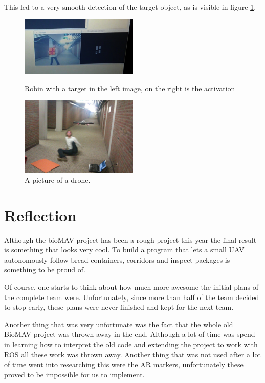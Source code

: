 \documentclass[a4paper,10pt]{article}
\begin{document}
This led to a very smooth detection of the target object, as is visible in figure \ref{fig:robinPresentActivation}. 

\begin{figure}[h!]
	\caption{Robin with a target in the left image, on the right is the activation}
	\centering
	\includegraphics[width=0.5\textwidth]{images/robinPresentActivation}
	\label{fig:robinPresentActivation}
\end{figure}

\begin{figure}[h!]
	\caption{A picture of a drone.}
	\centering
	\includegraphics[width=0.5\textwidth]{images/droneAttack}
\end{figure}

\section{Reflection}

Although the bioMAV project has been a rough project this year the final result is something that looks very cool. 
To build a program that lets a small UAV autonomously follow bread-containers, corridors and inspect packages is something to be proud of. 

Of course, one starts to think about how much more awesome the initial plans of the complete team were. 
Unfortunately, since more than half of the team decided to stop early, these plans were never finished and kept for the next team. 

Another thing that was very unfortunate was the fact that the whole old BioMAV project was thrown away in the end. 
Although a lot of time was spend in learning how to interpret the old code and extending the project to work with ROS all these work was thrown away. 
Another thing that was not used after a lot of time went into researching this were the AR markers, unfortunately these proved to be impossible for us to implement. 
\end{document}
